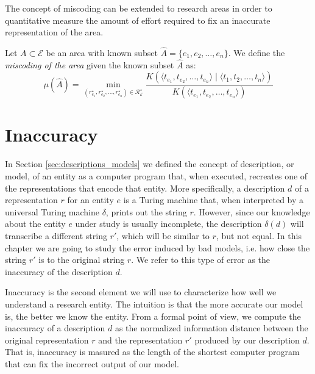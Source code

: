 {\color{red}

The concept of miscoding can be extended to research areas in order to quantitative measure the amount of effort required to fix an inaccurate representation of the area.

\begin{definition}
Let $A \subset \mathcal{E}$ be an area with known subset $\hat{A} = \{e_1, e_2, \ldots, e_n\}$. We define the \emph{miscoding of the area} given the known subset $\hat{A}$ as:
\[
\mu(\hat{A}) = \min_{(r^\star_{e_1}, r^\star_{e_2}, \ldots, r^\star_{e_n}) \in \mathcal{R}^\star_\mathcal{E}}  \frac{K \left( \langle t_{e_1}, t_{e_2}, \ldots, t_{e_n} \rangle \mid \langle t_1, t_2, \ldots, t_n \rangle \right) }{K \left( \langle t_{e_1}, t_{e_2}, \ldots, t_{e_n} \rangle \right)}
\]
\end{definition}

}


%
%
\section{Inaccuracy}

In Section \ref{sec:descriptions_models} we defined the concept of description, or model, of an entity as a computer program that, when executed, recreates one of the representations that encode that entity. More specifically, a description $d$ of a representation $r$ for an entity $e$ is a Turing machine that, when interpreted by a universal Turing machine $\delta$, prints out the string $r$. However, since our knowledge about the entity $e$ under study is usually incomplete, the description $\delta(d)$ will transcribe a different string $r'$, which will be similar to $r$, but not equal. In this chapter we are going to study the error induced by bad models, i.e. how close the string $r'$ is to the original string $r$. We refer to this type of error as the inaccuracy of the description $d$.

Inaccuracy is the second element we will use to characterize how well we understand a research entity. The intuition is that the more accurate our model is, the better we know the entity. From a formal point of view, we compute the inaccuracy of a description $d$ as the normalized information distance between the original representation $r$ and the representation $r'$ produced by our description $d$. That is, inaccuracy is masured as the length of the shortest computer program that can fix the incorrect output of our model.

